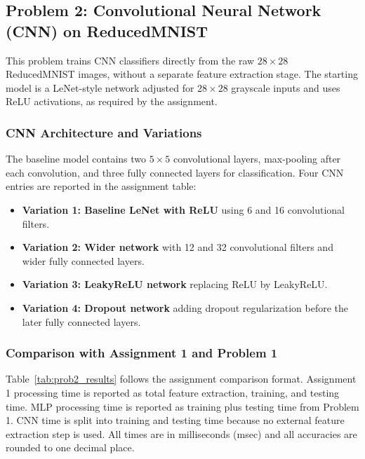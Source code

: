 \subsection{Problem 2: Convolutional Neural Network (CNN) on ReducedMNIST}

This problem trains CNN classifiers directly from the raw $28 \times 28$ ReducedMNIST images, without a separate feature extraction stage. The starting model is a LeNet-style network adjusted for $28 \times 28$ grayscale inputs and uses ReLU activations, as required by the assignment.

\subsubsection{CNN Architecture and Variations}
The baseline model contains two $5 \times 5$ convolutional layers, max-pooling after each convolution, and three fully connected layers for classification. Four CNN entries are reported in the assignment table:
\begin{itemize}
    \item \textbf{Variation 1: Baseline LeNet with ReLU} using 6 and 16 convolutional filters.
    \item \textbf{Variation 2: Wider network} with 12 and 32 convolutional filters and wider fully connected layers.
    \item \textbf{Variation 3: LeakyReLU network} replacing ReLU by LeakyReLU.
    \item \textbf{Variation 4: Dropout network} adding dropout regularization before the later fully connected layers.
\end{itemize}

\subsubsection{Comparison with Assignment 1 and Problem 1}
Table~\ref{tab:prob2_results} follows the assignment comparison format. Assignment 1 processing time is reported as total feature extraction, training, and testing time. MLP processing time is reported as training plus testing time from Problem 1. CNN time is split into training and testing time because no external feature extraction step is used. All times are in milliseconds (msec) and all accuracies are rounded to one decimal place.

